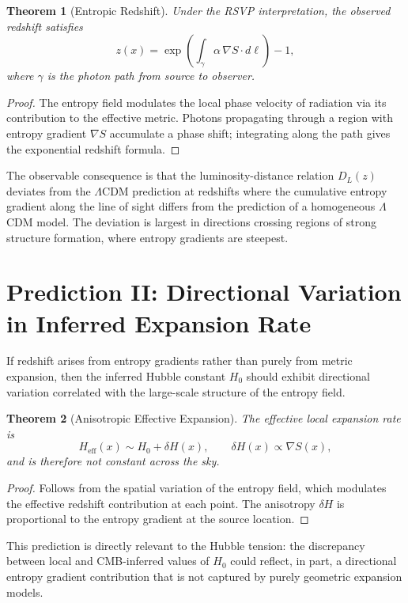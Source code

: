 \documentclass[12pt,a4paper,openany]{book}
\theoremstyle{plain}
\newtheorem{theorem}{Theorem}[chapter]
\theoremstyle{definition}
\theoremstyle{remark}
\begin{document}
\begin{theorem}[Entropic Redshift]
\label{thm:entropic_redshift}
Under the RSVP interpretation, the observed redshift satisfies
\[
z(x) = \exp\!\left(\int_\gamma \alpha\,\nabla S\cdot d\ell\right) - 1,
\]
where $\gamma$ is the photon path from source to observer.
\end{theorem}

\begin{proof}
The entropy field modulates the local phase velocity of radiation via its contribution to the effective metric. Photons propagating through a region with entropy gradient $\nabla S$ accumulate a phase shift; integrating along the path gives the exponential redshift formula.
\end{proof}

The observable consequence is that the luminosity-distance relation $D_L(z)$ deviates from the $\Lambda$CDM prediction at redshifts where the cumulative entropy gradient along the line of sight differs from the prediction of a homogeneous $\Lambda$CDM model. The deviation is largest in directions crossing regions of strong structure formation, where entropy gradients are steepest.

\section{Prediction II: Directional Variation in Inferred Expansion Rate}

If redshift arises from entropy gradients rather than purely from metric expansion, then the inferred Hubble constant $H_0$ should exhibit directional variation correlated with the large-scale structure of the entropy field.

\begin{theorem}[Anisotropic Effective Expansion]
\label{thm:anisotropic_H}
The effective local expansion rate is
\[
H_{\mathrm{eff}}(x) \sim H_0 + \delta H(x), \qquad \delta H(x) \propto \nabla S(x),
\]
and is therefore not constant across the sky.
\end{theorem}

\begin{proof}
Follows from the spatial variation of the entropy field, which modulates the effective redshift contribution at each point. The anisotropy $\delta H$ is proportional to the entropy gradient at the source location.
\end{proof}

This prediction is directly relevant to the Hubble tension: the discrepancy between local and CMB-inferred values of $H_0$ could reflect, in part, a directional entropy gradient contribution that is not captured by purely geometric expansion models.
\end{document}
